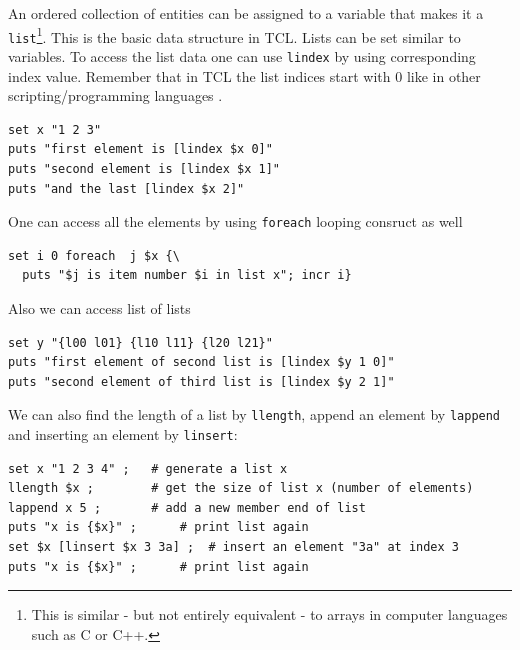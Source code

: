 \documentclass[
paper=a4,                       %
fontsize=11pt,                  %
twoside,                        %
footsepline,                    %
headsepline,                    %
headinclude=false,              %
footinclude=false,              %
pagesize,                       %
]{scrartcl}
\begin{document}
 An ordered collection of entities can be assigned to a variable that 
 makes it a \lstinline|list|\footnote{This is similar - but not entirely equivalent - to
 arrays in computer languages such as C or C++.}. This is the basic data
 structure in TCL. Lists can be set similar to variables.
 To access the list data one can use \lstinline|lindex| by using corresponding 
 index value. Remember that in TCL the list indices start with 0 like in other scripting/programming languages .
 
 {\small\vspace{0,2cm}
\begin{lstlisting}[numbers=none]
set x "1 2 3"
puts "first element is [lindex $x 0]"
puts "second element is [lindex $x 1]"
puts "and the last [lindex $x 2]"
\end{lstlisting}\vspace{0,2cm}
}

\noindent One can access all the elements by using \lstinline|foreach| looping 
consruct as well

{\small\vspace{0,2cm}
\begin{lstlisting}[numbers=none]
set i 0 foreach  j $x {\
  puts "$j is item number $i in list x"; incr i}
\end{lstlisting}\vspace{0,2cm}
}

\noindent Also we can access list of lists

{\small\vspace{0,2cm}
\begin{lstlisting}[numbers=none]
set y "{l00 l01} {l10 l11} {l20 l21}"
puts "first element of second list is [lindex $y 1 0]"
puts "second element of third list is [lindex $y 2 1]"
\end{lstlisting}\vspace{0,2cm}
}

\noindent We can also find the length of a list by \lstinline|llength|, append an 
element by \lstinline|lappend| and inserting an element by \lstinline|linsert|:
       
{\small\vspace{0,2cm}
\begin{lstlisting}[numbers=none]
set x "1 2 3 4" ; 	# generate a list x
llength $x ;		# get the size of list x (number of elements)
lappend x 5 ;		# add a new member end of list
puts "x is {$x}" ;		# print list again
set $x [linsert $x 3 3a] ;	# insert an element "3a" at index 3
puts "x is {$x}" ;		# print list again
\end{lstlisting}
}\vspace{0,2cm}
\end{document}

